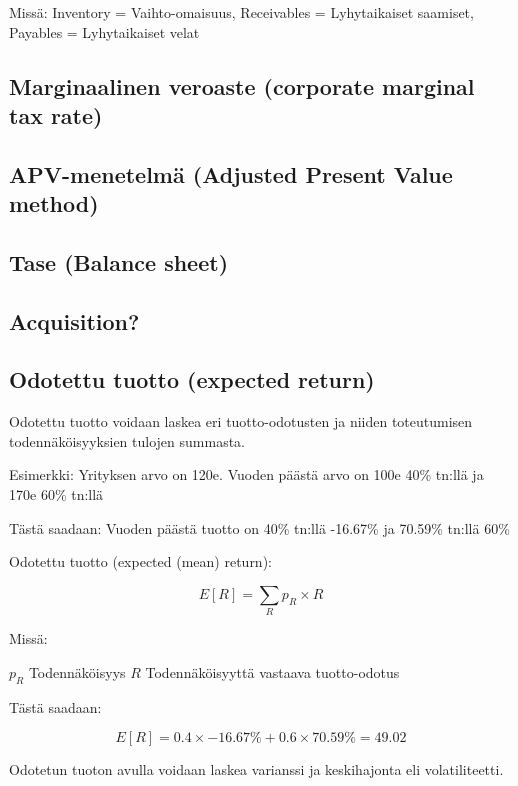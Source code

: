 \documentclass[a4paper]{article}
\begin{document}
Missä: Inventory = Vaihto-omaisuus, Receivables = Lyhytaikaiset saamiset, Payables = Lyhytaikaiset velat

\subsection{Marginaalinen veroaste (corporate marginal tax rate)}

\subsection{APV-menetelmä (Adjusted Present Value method)}

\subsection{Tase (Balance sheet)}

\subsection{Acquisition?}


\subsection{Odotettu tuotto (expected return)}

Odotettu tuotto voidaan laskea eri tuotto-odotusten ja niiden toteutumisen todennäköisyyksien tulojen summasta.

Esimerkki: Yrityksen arvo on 120e. Vuoden päästä arvo on 100e 40\% tn:llä ja 170e 60\% tn:llä

Tästä saadaan: Vuoden päästä tuotto on 40\% tn:llä -16.67\% ja 70.59\% tn:llä 60\%

Odotettu tuotto (expected (mean) return):

\[
E[R] = \sum_R{p_R \times R}
\]

Missä:

$p_R$ \quad Todennäköisyys
$R$ \quad Todennäköisyyttä vastaava tuotto-odotus

Tästä saadaan:

\[
E[R] = 0.4 \times -16.67\% + 0.6 \times 70.59\% = 49.02%
\]

Odotetun tuoton avulla voidaan laskea varianssi ja keskihajonta eli volatiliteetti.
\end{document}
